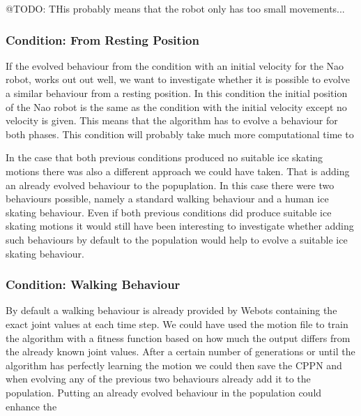 \documentclass[a4paper,10pt]{article}
\begin{document}
@TODO: THis probably means that the robot only has too small movements...


\subsubsection{Condition: From Resting Position}
If the evolved behaviour from the condition with an initial velocity for the Nao robot, works out out well, we want to investigate whether it is possible to evolve a similar behaviour from a resting position. In this condition the initial position of the Nao robot is the same as the condition with the initial velocity except no velocity is given. This means that the algorithm has to evolve a behaviour for both phases. This condition will probably take much more computational time to 




In the case that both previous conditions produced no suitable ice skating motions there was also a different approach we could have taken. That is adding an already evolved behaviour to the popuplation. In this case there were two behaviours possible, namely a standard walking behaviour and a human ice skating behaviour. Even if both previous conditions did produce suitable ice skating motions it would still have been interesting to investigate whether adding such behaviours by default to the population would help to evolve a suitable ice skating behaviour.



\subsubsection{Condition: Walking Behaviour}
By default a walking behaviour is already provided by Webots containing the exact joint values at each time step. We could have used the motion file to train the algorithm with a fitness function based on how much the output differs from the already known joint values. After a certain number of generations or until the algorithm has perfectly learning the motion we could then save the CPPN and when evolving any of the previous two behaviours already add it to the population. Putting an already evolved behaviour in the population could enhance the  
\end{document}
